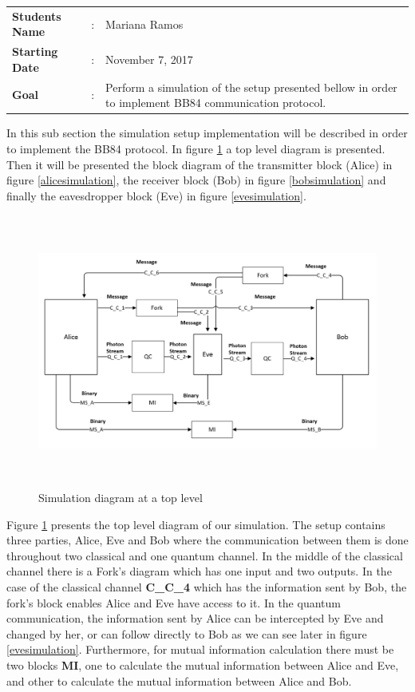 \begin{tcolorbox}	
\begin{tabular}{p{2.75cm} p{0.2cm} p{10.5cm}} 	
\textbf{Students Name}  &:& Mariana Ramos \\
\textbf{Starting Date} &:& November 7, 2017\\
\textbf{Goal}          &:& Perform a simulation of the setup presented bellow in order to implement BB84 communication protocol.
\end{tabular}
\end{tcolorbox}

In this sub section the simulation setup implementation will be described in order to implement the BB84 protocol. In figure \ref{toplevelsimulation} a top level diagram is presented. Then it will be presented the block diagram of the transmitter block (Alice) in figure \ref{alicesimulation}, the receiver block (Bob) in figure \ref{bobsimulation} and finally the eavesdropper block (Eve) in figure \ref{evesimulation}.

\begin{figure}[H]
	\centering
	\includegraphics[width=1.0\textwidth, height=9cm]{./sdf/bb84_with_discrete_variables/figures/toplevel_simulation.png}
	\caption{Simulation diagram at a top level}\label{toplevelsimulation}
\end{figure}

Figure \ref{toplevelsimulation} presents the top level diagram of our simulation. The setup contains three parties, Alice, Eve and Bob where the communication between them is done throughout two classical and one quantum channel. In the middle of the classical channel there is a Fork's diagram which has one input and two outputs. In the case of the classical channel \textbf{C\_C\_4} which has the information sent by Bob, the fork's block enables Alice and Eve have access to it. In the quantum communication, the information sent by Alice can be intercepted by Eve and changed by her, or can follow directly to Bob as we can see later in figure \ref{evesimulation}. Furthermore, for mutual information calculation there must be two blocks \textbf{MI}, one to calculate the mutual information between Alice and Eve, and other to calculate the mutual information between Alice and Bob.

